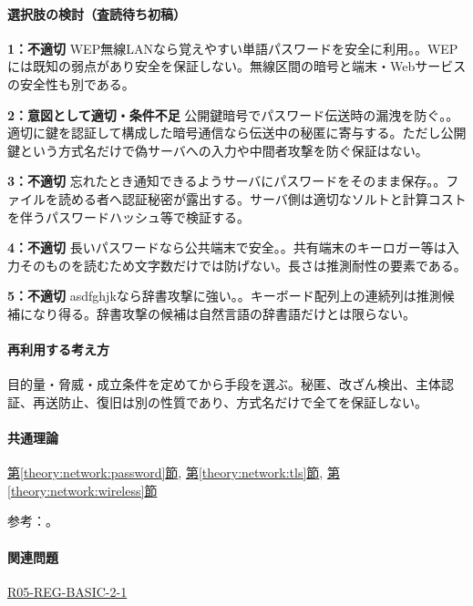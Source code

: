 \paragraph{選択肢の検討（査読待ち初稿）}\mbox{}\par

\noindent\textbf{1：不適切} WEP無線LANなら覚えやすい単語パスワードを安全に利用。。WEPには既知の弱点があり安全を保証しない。無線区間の暗号と端末・Webサービスの安全性も別である。\par

\noindent\textbf{2：意図として適切・条件不足} 公開鍵暗号でパスワード伝送時の漏洩を防ぐ。。適切に鍵を認証して構成した暗号通信なら伝送中の秘匿に寄与する。ただし公開鍵という方式名だけで偽サーバへの入力や中間者攻撃を防ぐ保証はない。\par

\noindent\textbf{3：不適切} 忘れたとき通知できるようサーバにパスワードをそのまま保存。。ファイルを読める者へ認証秘密が露出する。サーバ側は適切なソルトと計算コストを伴うパスワードハッシュ等で検証する。\par

\noindent\textbf{4：不適切} 長いパスワードなら公共端末で安全。。共有端末のキーロガー等は入力そのものを読むため文字数だけでは防げない。長さは推測耐性の要素である。\par

\noindent\textbf{5：不適切} asdfghjkなら辞書攻撃に強い。。キーボード配列上の連続列は推測候補になり得る。辞書攻撃の候補は自然言語の辞書語だけとは限らない。\par

\paragraph{再利用する考え方} 目的量・脅威・成立条件を定めてから手段を選ぶ。秘匿、改ざん検出、主体認証、再送防止、復旧は別の性質であり、方式名だけで全てを保証しない。

\paragraph{共通理論} \hyperref[theory:network:password]{第\ref*{theory:network:password}節}, \hyperref[theory:network:tls]{第\ref*{theory:network:tls}節}, \hyperref[theory:network:wireless]{第\ref*{theory:network:wireless}節}

\par 参考：\cite{net_nist2017,net_nist2025,net_wep}。

\paragraph{関連問題} \hyperref[q:r05-reg-basic-2-1]{R05-REG-BASIC-2-1}


